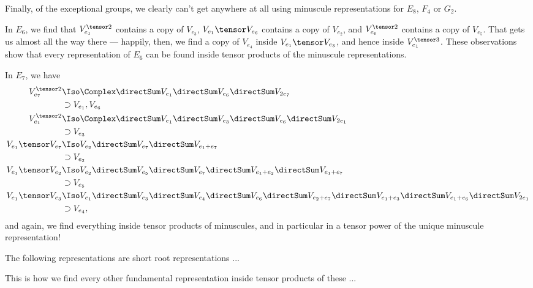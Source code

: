 Finally, of the exceptional groups, we clearly can't get anywhere at all using minuscule representations for $E_8$, $F_4$ or $G_2$.

In $E_6$,
we find that $V_{e_1}^{\tensor 2}$ contains a copy of $V_{e_3}$, $V_{e_1} \tensor V_{e_6}$ contains a copy of $V_{e_2}$, and $V_{e_6}^{\tensor 2}$ contains a copy of $V_{e_5}$.
That gets us almost all the way there --- happily, then, we find a copy of $V_{e_4}$ inside $V_{e_1} \tensor V_{e_3}$, and hence inside $V_{e_1}^{\tensor 3}$.
These observations show that every representation of $E_6$ can be found inside tensor products of the minuscule representations.

In $E_7$, we have
\begin{align*}
V_{e_7}^{\tensor 2} & \Iso \Complex \directSum V_{e_1} \directSum V_{e_6} \directSum V_{2e_7} \\
                    & \supset V_{e_1}, V_{e_6} \\
V_{e_1}^{\tensor 2} & \Iso \Complex \directSum V_{e_1} \directSum V_{e_3} \directSum V_{e_6} \directSum V_{2e_1} \\
                    & \supset V_{e_3} \\
V_{e_1} \tensor V_{e_7} & \Iso V_{e_2} \directSum V_{e_7} \directSum V_{e_1+e_7} \\
                        & \supset V_{e_2} \\
V_{e_1} \tensor V_{e_2} & \Iso V_{e_2} \directSum V_{e_5} \directSum V_{e_7} \directSum V_{e_1 + e_2} \directSum V_{e_1 + e_7} \\
                        & \supset V_{e_5} \\
V_{e_1} \tensor V_{e_3} & \Iso V_{e_1} \directSum V_{e_3} \directSum V_{e_4} \directSum V_{e_6} \directSum V_{e_2 + e_7}\directSum V_{e_1+e_3} \directSum V_{e_1+e_6}\directSum V_{2e_1}\\
                        & \supset V_{e_4},
\end{align*}
and again, we find everything inside tensor products of minuscules, and in particular in a tensor power of the unique minuscule representation!

The following representations are short root representations ...

This is how we find every other fundamental representation inside tensor
products of these ...

